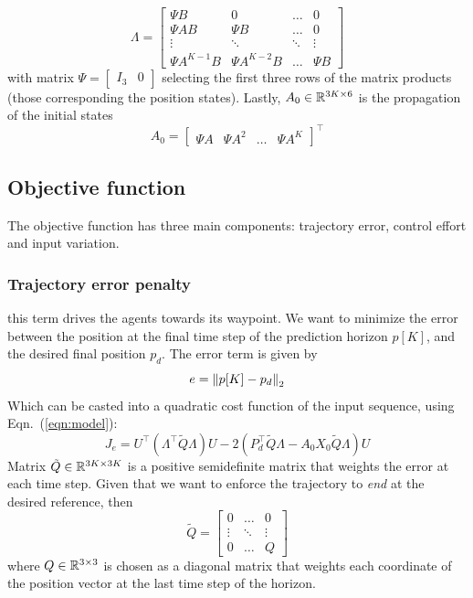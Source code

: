 \begin{equation}
\Lambda = \begin{bmatrix}
\Psi B & 0 & \ldots & 0\\
\Psi AB & \Psi B & \ldots & 0 \\
\vdots & \ddots & \ddots & \vdots \\
\Psi A^{K-1}B & \Psi A^{K-2}B & \dots & \Psi B 
\end{bmatrix}
\end{equation}
with matrix $\Psi = \begin{bmatrix}
I_3 & 0
\end{bmatrix}$ selecting the first three rows of the matrix products (those corresponding the position states). 
Lastly, $A_0 \in {\mathbb R}^{3K \times 6}$ is the propagation of the initial states
\begin{equation}
A_0 = \begin{bmatrix}
\Psi A & \Psi A^2 & \ldots & \Psi A^K
\end{bmatrix}^\top
\end{equation}

\subsection{Objective function}
The objective function has three main components: trajectory error, control effort and input variation.

\subsubsection{Trajectory error penalty}
this term drives the agents towards its waypoint. We want to minimize the error between the position at the final time step of the prediction horizon $p[K]$, and the desired final position $p_d$. The error term is given by
\begin{equation}
e = \left\Vert p[K]-p_d\right\Vert_2
\end{equation}
Which can be casted into a quadratic cost function of the input sequence, using Eqn.~(\ref{eqn:model}):
\begin{equation}
\label{eqn:error}
J_e = U^\top(\Lambda^{\top} \tilde{Q} \Lambda)U - 2(P_d^\top \tilde{Q} \Lambda -  A_0X_0 \tilde{Q} \Lambda)U
\end{equation}
Matrix $\tilde{Q} \in {\mathbb R}^{3K \times 3K} $ is a positive semidefinite matrix that weights the error at each time step. Given that we want to enforce the trajectory to \textit{end} at the desired reference, then
\begin{equation}
\tilde{Q} = \begin{bmatrix}
0 & \ldots & 0 \\
\vdots & \ddots & \vdots \\
0 & \ldots & Q
\end{bmatrix}
\end{equation}
where $Q \in {\mathbb R}^{3 \times 3}$ is chosen as a diagonal matrix that weights each coordinate of the position vector at the last time step of the horizon.

